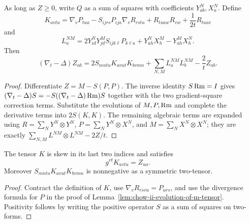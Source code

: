\begin{theorem}
\label{thm:chow-ii-minimizing-harnack-two-tensor-evolution}
As long as \(Z\ge0\), write \(Q\) as a sum of squares with coefficients
\(Y^N_{ab},X^N_a\).  Define
\[
K_{avtu}=\nabla_vP_{tua}-S_{ijrs}P_{ija}\nabla_vR_{rstu}
+R_{tuaw}R_{vw}+\frac1{2t}R_{tuav}
\]
and
\[
L_a^{NM}=2Y_{id}^NY_{jd}^MS_{ijk\ell}P_{k\ell a}
+Y_{ah}^NX_h^M-Y_{ah}^MX_h^N.
\]
Then
\[
(\nabla_t-\Delta)Z_{ab}=2S_{mntu}K_{avut}K_{bvmn}
+\sum_{N,M}L_a^{NM}L_b^{NM}-\frac2tZ_{ab}.
\]
\end{theorem}
\begin{proof}
Differentiate \(Z=M-S(P,P)\).  The inverse identity \(S\operatorname{Rm}=I\) gives
\((\nabla_t-\Delta)S=-S((\nabla_t-\Delta)\operatorname{Rm})S\) together with the two
gradient-square correction terms.  Substitute the evolutions of \(M,P,\operatorname{Rm}\)
and complete the derivative terms into \(2S(K,K)\).  The remaining algebraic
terms are expanded using
\(R=\sum_NY^N\otimes Y^N\),
\(P=\sum_NY^N\otimes X^N\), and
\(M=\sum_NX^N\otimes X^N\); they are exactly
\(\sum_{N,M}L^{NM}\otimes L^{NM}-2Z/t\).
\end{proof}

\begin{remark}
\label{rem:chow-ii-k-tensor-trace-is-z}
The tensor \(K\) is skew in its last two indices and satisfies
\[
g^{vt}K_{avtu}=Z_{ua}.
\]
Moreover \(S_{mntu}K_{avut}K_{bvmn}\) is nonnegative as a symmetric
two-tensor.
\end{remark}
\begin{proof}
Contract the definition of \(K\), use
\(\nabla_vR_{rsvu}=P_{urs}\), and use the divergence formula for \(P\) in
the proof of Lemma~\ref{lem:chow-ii-evolution-of-m-tensor}.  Positivity follows
by writing the positive operator \(S\) as a sum of squares on two-forms.
\end{proof}

